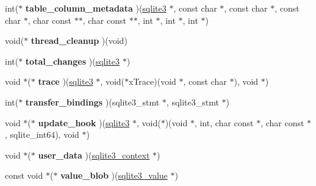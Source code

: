 \begin{DoxyCompactItemize}
\item 
\hypertarget{structsqlite3__api__routines_a8fdf517f6c889edf0e0206fd8846eba5}{int($\ast$ {\bfseries table\-\_\-column\-\_\-metadata} )(\hyperlink{structsqlite3}{sqlite3} $\ast$, const char $\ast$, const char $\ast$, const char $\ast$, char const $\ast$$\ast$, char const $\ast$$\ast$, int $\ast$, int $\ast$, int $\ast$)}\label{structsqlite3__api__routines_a8fdf517f6c889edf0e0206fd8846eba5}

\item 
\hypertarget{structsqlite3__api__routines_aafef606568e3b1706477c795e343da66}{void($\ast$ {\bfseries thread\-\_\-cleanup} )(void)}\label{structsqlite3__api__routines_aafef606568e3b1706477c795e343da66}

\item 
\hypertarget{structsqlite3__api__routines_a5bf72c6b416c8a29ed60940947ce5737}{int($\ast$ {\bfseries total\-\_\-changes} )(\hyperlink{structsqlite3}{sqlite3} $\ast$)}\label{structsqlite3__api__routines_a5bf72c6b416c8a29ed60940947ce5737}

\item 
\hypertarget{structsqlite3__api__routines_acfcae876299cbd94ea3c2da505f1ddc6}{void $\ast$($\ast$ {\bfseries trace} )(\hyperlink{structsqlite3}{sqlite3} $\ast$, void($\ast$x\-Trace)(void $\ast$, const char $\ast$), void $\ast$)}\label{structsqlite3__api__routines_acfcae876299cbd94ea3c2da505f1ddc6}

\item 
\hypertarget{structsqlite3__api__routines_a76b183a79f69910802d39aa9898cef4e}{int($\ast$ {\bfseries transfer\-\_\-bindings} )(sqlite3\-\_\-stmt $\ast$, sqlite3\-\_\-stmt $\ast$)}\label{structsqlite3__api__routines_a76b183a79f69910802d39aa9898cef4e}

\item 
\hypertarget{structsqlite3__api__routines_aea19a900175c37e18c00382aa1ac26bb}{void $\ast$($\ast$ {\bfseries update\-\_\-hook} )(\hyperlink{structsqlite3}{sqlite3} $\ast$, void($\ast$)(void $\ast$, int, char const $\ast$, char const $\ast$, sqlite\-\_\-int64), void $\ast$)}\label{structsqlite3__api__routines_aea19a900175c37e18c00382aa1ac26bb}

\item 
\hypertarget{structsqlite3__api__routines_aa8781948e7c68d91a9c666469dca118b}{void $\ast$($\ast$ {\bfseries user\-\_\-data} )(\hyperlink{structsqlite3__context}{sqlite3\-\_\-context} $\ast$)}\label{structsqlite3__api__routines_aa8781948e7c68d91a9c666469dca118b}

\item 
\hypertarget{structsqlite3__api__routines_a7e3904fdaa27da60c444d080331ed091}{const void $\ast$($\ast$ {\bfseries value\-\_\-blob} )(\hyperlink{struct_mem}{sqlite3\-\_\-value} $\ast$)}\label{structsqlite3__api__routines_a7e3904fdaa27da60c444d080331ed091}


\end{DoxyCompactItemize}
